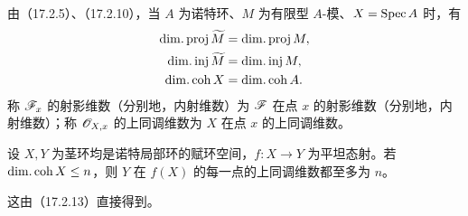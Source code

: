 由（17.2.5）、（17.2.10），当 $A$ 为诺特环、$M$ 为有限型 $A$-模、$X=\operatorname{Spec} A$ 时，有
\[
 \begin{aligned}
 \operatorname{dim.proj}\widetilde M&=\operatorname{dim.proj} M,\\
 \operatorname{dim.inj}\widetilde M&=\operatorname{dim.inj} M,\\
 \operatorname{dim.coh} X&=\operatorname{dim.coh} A.
 \end{aligned}
\]
称 $\mathscr F_x$ 的射影维数（分别地，内射维数）为 $\mathscr F$ 在点 $x$ 的射影维数（分别地，内射维数）；称 $\mathscr O_{X,x}$ 的上同调维数为 $X$ 在点 $x$ 的上同调维数。

设 $X,Y$ 为茎环均是诺特局部环的赋环空间，$f:X\to Y$ 为平坦态射。若 $\operatorname{dim.coh} X\leq n$，则 $Y$ 在 $f(X)$ 的每一点的上同调维数都至多为 $n$。

这由（17.2.13）直接得到。
